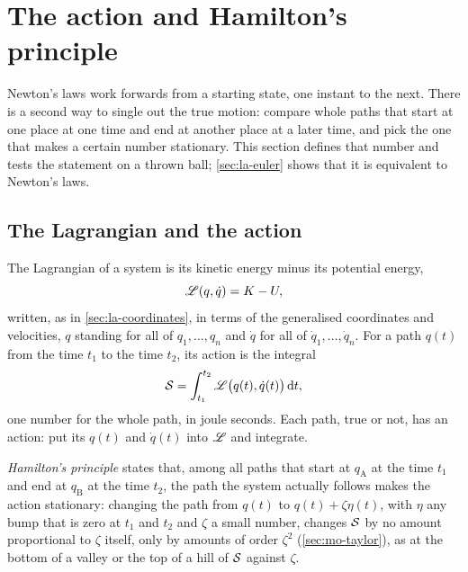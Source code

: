\section{The action and Hamilton's principle}
\label{sec:la-action}

Newton's laws work forwards from a starting state, one instant to the
next. There is a second way to single out the true motion: compare whole
paths that start at one place at one time and end at another place at a
later time, and pick the one that makes a certain number stationary. This
section defines that number and tests the statement on a thrown ball;
\cref{sec:la-euler} shows that it is equivalent to Newton's laws.

\subsection*{The Lagrangian and the action}

The Lagrangian of a system is its kinetic energy minus its potential
energy,
\begin{equation}
   \mathscr{L}(q, \dot{q}) = K - U ,
   \label{eq:la-lagrangian}
\end{equation}
written, as in \cref{sec:la-coordinates}, in terms of the generalised
coordinates and velocities, $q$ standing for all of $q_1, \dots, q_n$ and
$\dot{q}$ for all of $\dot{q}_1, \dots, \dot{q}_n$. For a path $q(t)$ from the time $t_1$ to the
time $t_2$, its action is the integral
\begin{equation}
   \mathcal{S} = \int_{t_1}^{t_2}\mathscr{L}\bigl(q(t), \dot{q}(t)\bigr)\,\mathrm{d} t ,
   \label{eq:la-action}
\end{equation}
one number for the whole path, in joule seconds. Each path, true or not,
has an action: put its $q(t)$ and $\dot{q}(t)$ into $\mathscr{L}$ and integrate.

\emph{Hamilton's principle} states that, among all paths that start at
$q_{\mathrm{A}}$ at the time $t_1$ and end at $q_{\mathrm{B}}$ at the time
$t_2$, the path the system actually follows makes the action stationary:
changing the path from $q(t)$ to $q(t) + \zeta\eta(t)$, with $\eta$ any bump
that is zero at $t_1$ and $t_2$ and $\zeta$ a small number, changes $\mathcal{S}$
by no amount proportional to $\zeta$ itself, only by amounts of order
$\zeta^2$ (\cref{sec:mo-taylor}), as at the bottom of a valley or the top
of a hill of $\mathcal{S}$ against $\zeta$.

